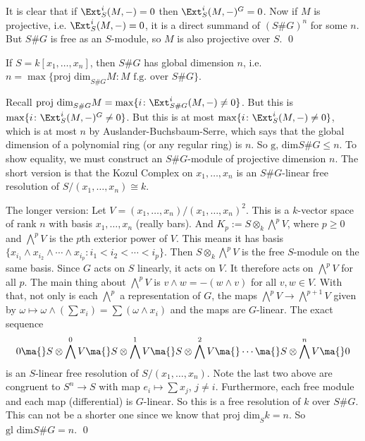It is clear that if $\Ext_S^i(M,-)=0$ then $\Ext_S^i(M,-)^G=0$. Now if $M$ is projective, i.e. $\Ext_S^i(M,-)=0$, it is a direct summand of $(S\#G)^n$ for some $n$. But $S\#G$ is free as an $S$-module, so $M$ is also projective over $S$. \qed \\


\begin{cor}
If $S= k[x_1,\ldots,x_n]$, then $S\#G$ has global dimension $n$, i.e. $n= \max\{ \text{proj dim}_{S\#G} M \colon M \text{ f.g. over } S\#G\}$. 
\end{cor}

\pf Recall $\text{proj dim}_{S\#G} M= \max\{ i \colon \Ext_{S\#G}^i(M,-) \neq 0 \}$. But this is $\max \{ i \colon \Ext_S^i(M,-)^G \neq 0 \}$. But this is at most $\max \{ i \colon \Ext_S^i(M,-) \neq 0\}$, which is at most $n$ by Auslander-Buchsbaum-Serre, which says that the global dimension of a polynomial ring (or any regular ring) is $n$. So $\text{g, dim} S\#G \leq n$. To show equality, we must construct an $S\#G$-module of projective dimension $n$. The short version is that the Kozul Complex on $x_1,\ldots,x_n$ is an $S\#G$-linear free resolution of $S/(x_1,\ldots,x_n) \cong k$. 


The longer version: Let $V= (x_1,\ldots,x_n)/(x_1,\ldots,x_n)^2$. This is a $k$-vector space of rank $n$ with basis $x_1,\ldots,x_n$ (really bars). And $K_p:= S \otimes_k \bigwedge^p V$, where $p \geq 0$ and $\bigwedge^p V$ is the $p$th exterior power of $V$. This means it has basis $\{ x_{i_1} \wedge x_{i_2} \wedge \cdots \wedge x_{i_p} \colon i_1<i_2<\cdots<i_p\}$. Then $S \otimes_k \bigwedge^p V$ is the free $S$-module on the same basis. Since $G$ acts on $S$ linearly, it acts on $V$. It therefore acts on $\bigwedge^p V$ for all $p$. The main thing about $\bigwedge^p V$ is $v \wedge w= -(w \wedge v)$ for all $v,w \in V$. With that, not only is each $\bigwedge^p$ a representation of $G$, the maps $\bigwedge^p V \to \bigwedge^{p+1} V$ given by $\omega \mapsto \omega \wedge (\sum x_i)= \sum (\omega \wedge x_i)$ and the maps are $G$-linear. The exact sequence 
	\[
	0 \ma{} S \otimes \bigwedge^0 V \ma{} S \otimes \bigwedge^1 V \ma{} S \otimes \bigwedge^2 V \ma{} \cdots \ma{} S \otimes \bigwedge^n V \ma{} 0
	\]
is an $S$-linear free resolution of $S/(x_1,\ldots,x_n)$. Note the last two above are congruent to $S^n \to S$ with map $e_i \mapsto \sum x_j$, $j \neq i$. Furthermore, each free module and each map (differential) is $G$-linear. So this is a free resolution of $k$ over $S\#G$. This can not be a shorter one since we know that $\text{proj dim}_S k= n$. So $\text{gl dim} S\#G= n$. \qed \\


